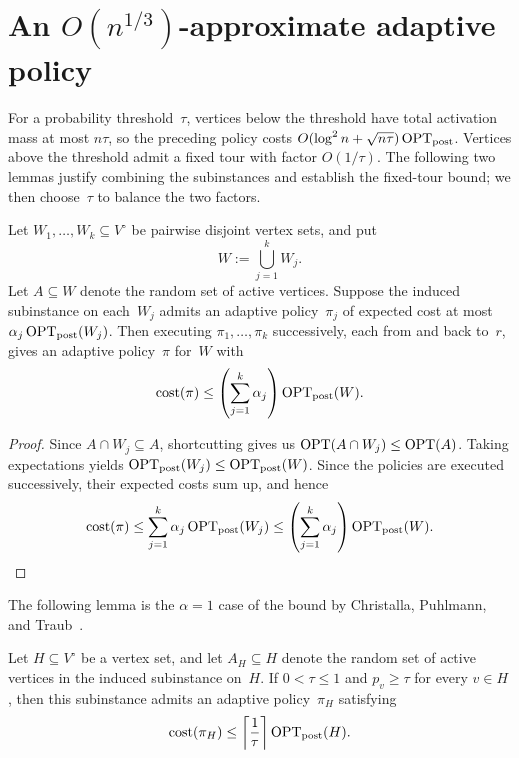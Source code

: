 \documentclass[12pt,a4paper,oneside]{report}
\begin{document}
\section{An \texorpdfstring{$O(n^{1/3})$}{O(n to the 1/3)}-approximate adaptive policy}
\label{sec:asymmetric-approximate-adaptive-policy}

For a probability threshold~$\tau$, vertices below the threshold have total
activation mass at most $n\tau$, so the preceding policy costs
$O(\log^2 n+\sqrt{n\tau})\operatorname{OPT}_\mathrm{post}$.  Vertices above the threshold admit a
fixed tour with factor $O(1/\tau)$.  The following two lemmas justify
combining the subinstances and establish the fixed-tour bound; we then
choose~$\tau$ to balance the two factors.

\begin{lemma}
\label{lem:adaptive-policy-concatenation}
Let $W_1,\ldots,W_k\subseteq V^\circ$ be pairwise disjoint vertex sets, and
put
\[
    W:=\bigcup_{j=1}^k W_j.
\]
Let $A\subseteq W$ denote the random set of active vertices.  Suppose the induced subinstance on each~$W_j$ admits an
adaptive policy~$\pi_j$ of expected cost at most
$\alpha_j\operatorname{OPT}_\mathrm{post}(W_j)$.  Then executing
$\pi_1,\ldots,\pi_k$ successively, each from and back to~$r$, gives an
adaptive policy~$\pi$ for~$W$ with
\[
    \operatorname{cost}(\pi)
    \le
    \left(\sum_{j=1}^k\alpha_j\right)\operatorname{OPT}_\mathrm{post}(W).
\]
\end{lemma}

\begin{proof}
Since $A\cap W_j\subseteq A$, shortcutting gives us $\operatorname{OPT}(A\cap W_j)\le\operatorname{OPT}(A)$.
Taking expectations yields
$\operatorname{OPT}_\mathrm{post}(W_j)\le\operatorname{OPT}_\mathrm{post}(W)$.  Since the policies are executed successively,
their expected costs sum up, and hence
\[
    \operatorname{cost}(\pi)
    \le\sum_{j=1}^k\alpha_j\operatorname{OPT}_\mathrm{post}(W_j)
    \le
    \left(\sum_{j=1}^k\alpha_j\right)\operatorname{OPT}_\mathrm{post}(W).
\]
\end{proof}

The following lemma is the $\alpha=1$ case of the bound by Christalla,
Puhlmann, and Traub~\cite[Proposition~4.8]{Christalla2025}.
\begin{lemma}
\label{lem:high-probability-fixed-tour}
Let $H\subseteq V^\circ$ be a vertex set, and let $A_H\subseteq H$ denote the
random set of active vertices in the induced subinstance on~$H$.  If
$0<\tau\le1$ and $p_v\ge\tau$ for every $v\in H$, then this subinstance
admits an adaptive policy~$\pi_H$ satisfying
\[
    \operatorname{cost}(\pi_H)
    \le
    \left\lceil\frac1\tau\right\rceil\operatorname{OPT}_\mathrm{post}(H).
\]
\end{lemma}
\end{document}
